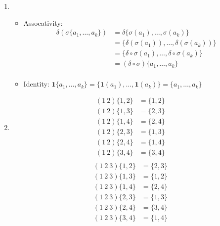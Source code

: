 \documentclass{article}
\newcommand{\set}[1]{ \{ #1 \} }
\newcommand{\id}{ \bm{1} }
\newcommand{\comp}{ \circ }
\begin{document}
\subsubsection{}\label{ex7p8}
\begin{enumerate}
\item 
\begin{itemize}
\item Assocativity:
\begin{align*}
\delta(\sigma\set{a_1,\ldots,a_k}) &= \delta\set{\sigma(a_1),\ldots,\sigma(a_k)}\\
&= \set{\delta(\sigma(a_1)),\ldots,\delta(\sigma(a_k))}\\
&= \set{\delta\comp\sigma(a_1),\ldots,\delta\comp\sigma(a_k)}\\
&= (\delta\comp\sigma)\set{a_1,\ldots,a_k}\\
\end{align*}
\item Identity: $\id\set{a_1,\ldots,a_k} = \set{\id(a_1),\ldots,\id(a_k)} = \set{a_1,\ldots,a_k}$
\end{itemize}
\item
\begin{align*}
(1\ 2)\set{1,2} &= \set{1,2}\\
(1\ 2)\set{1,3} &= \set{2,3}\\
(1\ 2)\set{1,4} &= \set{2,4}\\
(1\ 2)\set{2,3} &= \set{1,3}\\
(1\ 2)\set{2,4} &= \set{1,4}\\
(1\ 2)\set{3,4} &= \set{3,4}\\
\end{align*}
\begin{align*}
(1\ 2\ 3)\set{1,2} &= \set{2,3}\\
(1\ 2\ 3)\set{1,3} &= \set{1,2}\\
(1\ 2\ 3)\set{1,4} &= \set{2,4}\\
(1\ 2\ 3)\set{2,3} &= \set{1,3}\\
(1\ 2\ 3)\set{2,4} &= \set{3,4}\\
(1\ 2\ 3)\set{3,4} &= \set{1,4}\\
\end{align*}
\end{enumerate}
\end{document}
